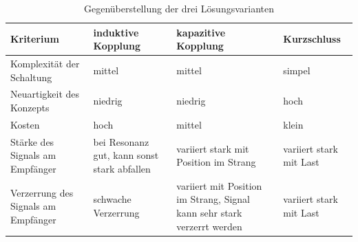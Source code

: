 \begin{table}[h!tb]
    \centering
    \small
    \caption{Gegen\"uberstellung der drei L\"osungsvarianten}
    \label{tab:simu:conclusion}
    \begin{tabular}{p{38mm}p{28mm}p{28mm}p{28mm}}
        \toprule
        \textbf{Kriterium} &
        \textbf{induktive Kopplung} &
        \textbf{kapazitive Kopplung} &
        Kurzschluss \\

        \midrule

        Komplexit\"at der Schaltung &
        mittel &
        mittel &
        simpel \\
        [2mm]

        \rowcolor{solarized-base2}
        Neuartigkeit des Konzepts &
        niedrig &
        niedrig &
        hoch \\
        [2mm]

        Kosten &
        hoch &
        mittel &
        klein  \\
        [2mm]

        \rowcolor{solarized-base2}
        St\"arke des Signals am Empf\"anger &
        bei Resonanz gut, kann sonst stark abfallen &
        variiert stark mit Position im Strang &
        variiert stark mit Last \\
        [2mm]

        Verzerrung des Signals am Empf\"anger &
        schwache Verzerrung &
        variiert mit Position im Strang, Signal kann sehr stark verzerrt werden &
        variiert stark mit Last \\
        \bottomrule
    \end{tabular}
\end{table}
